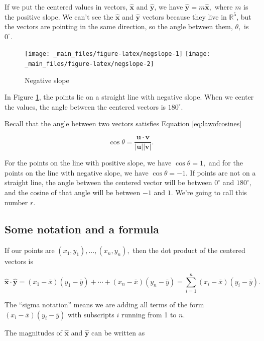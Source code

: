 \documentclass[
]{book}
\theoremstyle{definition}
\theoremstyle{definition}
\theoremstyle{definition}
\theoremstyle{definition}
\theoremstyle{remark}
\begin{document}
If we put the centered values in vectors, \(\hat{\mathbf{x}}\) and \(\hat{\mathbf{y}}\), we have \(\hat{\mathbf{y}}=m\hat{\mathbf{x}},\) where \(m\) is the positive slope. We can't see the \(\hat{\mathbf{x}}\) and \(\hat{\mathbf{y}}\) vectors because they live in \(\mathbb{R}^5\), but the vectors are pointing in the same direction, so the angle between them, \(\theta,\) is \(0^{\circ}.\)

\begin{figure}
\texttt{[image: \_main\_files/figure-latex/negslope-1]} \texttt{[image: \_main\_files/figure-latex/negslope-2]} \caption{Negative slope}\label{fig:negslope}
\end{figure}

In Figure \ref{fig:negslope}, the points lie on a straight line with negative slope. When we center the values, the angle between the centered vectors is \(180^{\circ}.\)

Recall that the angle between two vectors satisfies Equation \eqref{eq:lawofcosines}

\[\cos\theta=\frac{\mathbf{u}\cdot \mathbf{v}}{|\mathbf{u}||\mathbf{v}|}.\]

For the points on the line with positive slope, we have \(\cos\theta=1,\) and for the points on the line with negative slope, we have \(\cos\theta=-1.\) If points are not on a straight line, the angle between the centered vector will be between \(0^{\circ}\) and \(180^{\circ},\) and the cosine of that angle will be between \(-1\) and \(1.\) We're going to call this number \(r.\)

\subsection*{Some notation and a formula}\label{some-notation-and-a-formula}

If our points are \((x_1,y_1),\dots,(x_n,y_n),\) then the dot product of the centered vectors is

\[\hat{\mathbf{x}}\cdot\hat{\mathbf{y}}=(x_1-\bar{x})(y_1-\bar{y})+\cdots+(x_n-\bar{x})(y_n-\bar{y})=\sum_{i=1}^n (x_i-\bar{x})(y_i-\bar{y}).\]

The ``sigma notation'' means we are adding all terms of the form \((x_i-\bar{x})(y_i-\bar{y})\) with subscripts \(i\) running from 1 to \(n.\)

The magnitudes of \(\hat{\mathbf{x}}\) and \(\hat{\mathbf{y}}\) can be written as
\end{document}

